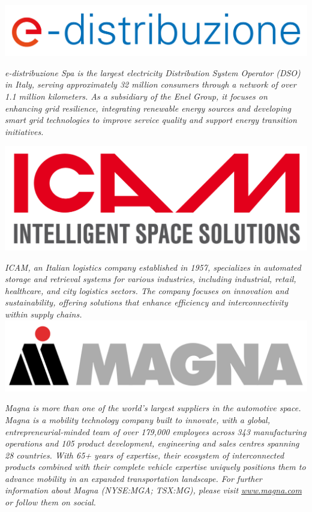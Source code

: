 \documentclass[
	openany, %
	parskip=full, %
	12pt, %
	a4paper, %
]{conferencebooklet} %
\begin{document}
\begin{multicols*}{2}
    \hfill\includegraphics[width=\sponsorscaling\linewidth]{logos/edistribuzione.png}\hspace*{\fill}

    \textit{e-distribuzione Spa is the largest electricity Distribution System Operator (DSO) in Italy, serving approximately 32 million consumers through a network of over 1.1 million kilometers. As a subsidiary of the Enel Group, it focuses on enhancing grid resilience, integrating renewable energy sources and developing smart grid technologies to improve service quality and support energy transition initiatives.}

    \hfill\includegraphics[width=\sponsorscaling\linewidth]{logos/icam.jpg}\hspace*{\fill}

    \textit{ICAM, an Italian logistics company established in 1957, specializes in automated storage and retrieval systems for various industries, including industrial, retail, healthcare, and city logistics sectors. The company focuses on innovation and sustainability, offering solutions that enhance efficiency and interconnectivity within supply chains.} \\

    \hfill\includegraphics[width=\sponsorscaling\linewidth]{logos/magna.png}\hspace*{\fill}
    
    \textit{Magna is more than one of the world’s largest suppliers in the automotive space. Magna is a mobility technology company built to innovate, with a global, entrepreneurial-minded team of over 179,000 employees across 343 manufacturing operations and 105 product development, engineering and sales centres spanning 28 countries. With 65+ years of expertise, their ecosystem of interconnected products combined with their complete vehicle expertise uniquely positions them to advance mobility in an expanded transportation landscape. For further information about Magna (NYSE:MGA; TSX:MG), please visit \url{www.magna.com} or follow them on social.} \\


\end{multicols*}
\end{document}
